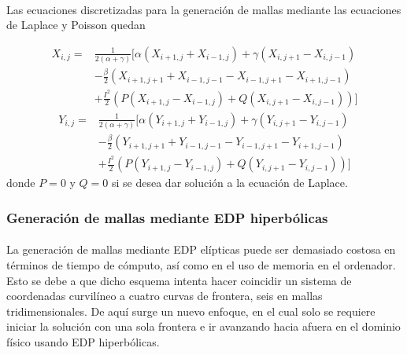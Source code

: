 \documentclass[letterpaper, openright, 12pt]{book}
\begin{document}
    \paragraph*{}
    Las ecuaciones discretizadas para la generación de mallas mediante las
    ecuaciones de Laplace y Poisson quedan

    \begin{align}
        X_{i, j} =& \frac{1}{2 \left(\alpha + \gamma\right)}
        \Biggl[
            \alpha \left(X_{i+1, j} + X_{i-1, j}\right)
            + \gamma \left(X_{i, j+1} - X_{i, j-1}\right)\\
            &- \frac{\beta}{2} \left(X_{i+1, j+1} + X_{i-1, j-1}
                    - X_{i-1, j+1} - X_{i+1, j-1}\right)\\
            &+ \frac{I^2}{2} \left( P \left(X_{i+1, j} - X_{i-1, j}\right)
            + Q \left( X_{i, j+1} - X_{i, j-1} \right)\right)
        \Biggr]
    \end{align}
    \begin{align}
        Y_{i, j} =& \frac{1}{2 \left(\alpha + \gamma\right)}
        \Biggl[
            \alpha \left(Y_{i+1, j} + Y_{i-1, j}\right)
            + \gamma \left(Y_{i, j+1} - Y_{i, j-1}\right)\\
            &- \frac{\beta}{2} \left(Y_{i+1, j+1} + Y_{i-1, j-1}
                    - Y_{i-1, j+1} - Y_{i+1, j-1}\right)\\
            &+ \frac{I^2}{2} \left( P \left(Y_{i+1, j} - Y_{i-1, j}\right)
            + Q \left( Y_{i, j+1} - Y_{i, j-1} \right)\right)
        \Biggr]
    \end{align}
    donde $P=0$ y $Q=0$ si se desea dar solución a la ecuación de Laplace.

    \subsubsection{Generación de mallas mediante EDP hiperbólicas}
    \paragraph*{}
    La generación de mallas mediante EDP elípticas puede ser demasiado
    costosa en términos de tiempo de cómputo, así como en el uso de memoria
    en el ordenador. Esto se debe a que dicho esquema intenta hacer
    coincidir un sistema de coordenadas curvilíneo a cuatro curvas de
    frontera, seis en mallas tridimensionales. De aquí surge un nuevo
    enfoque, en el cual solo se requiere iniciar la solución con una sola
    frontera e ir avanzando hacia afuera en el dominio físico usando EDP
    hiperbólicas. \cite{farrashkhalvat}
\end{document}
